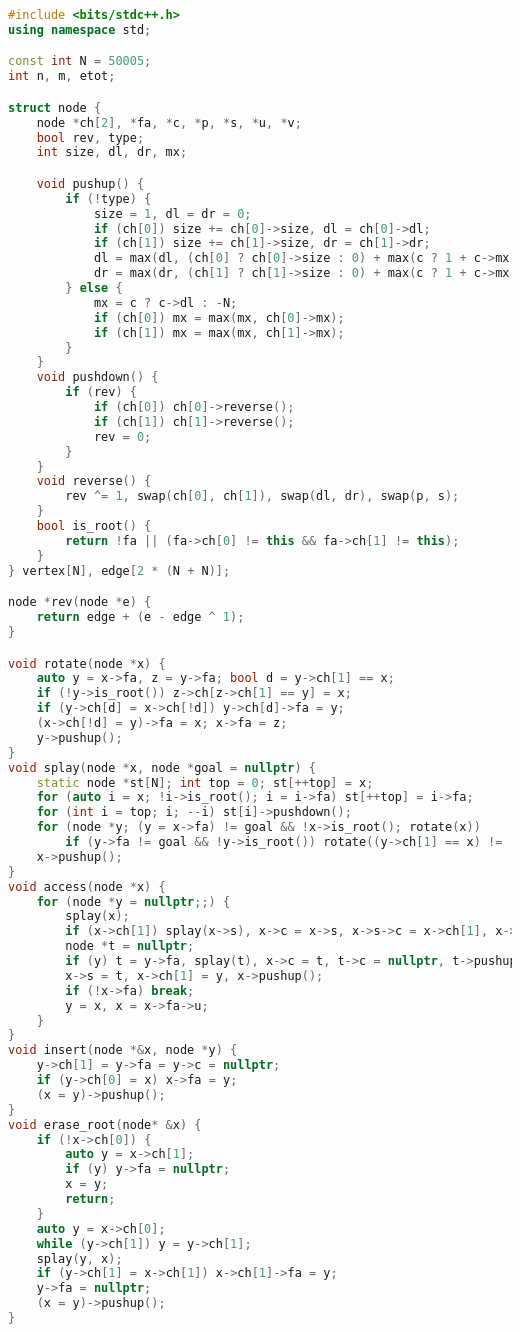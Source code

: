 \begin{lstlisting}[language=C++]
#include <bits/stdc++.h>
using namespace std;

const int N = 50005;
int n, m, etot;

struct node {
	node *ch[2], *fa, *c, *p, *s, *u, *v;
	bool rev, type;
	int size, dl, dr, mx;

	void pushup() {
		if (!type) {
			size = 1, dl = dr = 0;
			if (ch[0]) size += ch[0]->size, dl = ch[0]->dl;
			if (ch[1]) size += ch[1]->size, dr = ch[1]->dr;
			dl = max(dl, (ch[0] ? ch[0]->size : 0) + max(c ? 1 + c->mx : 0, (ch[1] ? 1 + ch[1]->dl : 0)));
			dr = max(dr, (ch[1] ? ch[1]->size : 0) + max(c ? 1 + c->mx : 0, (ch[0] ? 1 + ch[0]->dr : 0)));
		} else {
			mx = c ? c->dl : -N;
			if (ch[0]) mx = max(mx, ch[0]->mx);
			if (ch[1]) mx = max(mx, ch[1]->mx);
		}
	}
	void pushdown() {
		if (rev) {
			if (ch[0]) ch[0]->reverse();
			if (ch[1]) ch[1]->reverse();
			rev = 0;
		}
	}
	void reverse() {
		rev ^= 1, swap(ch[0], ch[1]), swap(dl, dr), swap(p, s);
	}
	bool is_root() {
		return !fa || (fa->ch[0] != this && fa->ch[1] != this);
	}
} vertex[N], edge[2 * (N + N)];

node *rev(node *e) {
	return edge + (e - edge ^ 1);
}

void rotate(node *x) {
	auto y = x->fa, z = y->fa; bool d = y->ch[1] == x;
	if (!y->is_root()) z->ch[z->ch[1] == y] = x;
	if (y->ch[d] = x->ch[!d]) y->ch[d]->fa = y;
	(x->ch[!d] = y)->fa = x; x->fa = z;
	y->pushup();
}
void splay(node *x, node *goal = nullptr) {
	static node *st[N]; int top = 0; st[++top] = x;
	for (auto i = x; !i->is_root(); i = i->fa) st[++top] = i->fa;
	for (int i = top; i; --i) st[i]->pushdown();
	for (node *y; (y = x->fa) != goal && !x->is_root(); rotate(x))
		if (y->fa != goal && !y->is_root()) rotate((y->ch[1] == x) != (y->fa->ch[1] == y) ? x : y);
	x->pushup();
}
void access(node *x) {
	for (node *y = nullptr;;) {
		splay(x);
		if (x->ch[1]) splay(x->s), x->c = x->s, x->s->c = x->ch[1], x->ch[1]->fa = x->s, x->s->pushup();
		node *t = nullptr;
		if (y) t = y->fa, splay(t), x->c = t, t->c = nullptr, t->pushup(), y->fa = x;
		x->s = t, x->ch[1] = y, x->pushup();
		if (!x->fa) break;
		y = x, x = x->fa->u;
	}
}
void insert(node *&x, node *y) {
	y->ch[1] = y->fa = y->c = nullptr;
	if (y->ch[0] = x) x->fa = y;
	(x = y)->pushup();
}
void erase_root(node* &x) {
	if (!x->ch[0]) {
		auto y = x->ch[1];
		if (y) y->fa = nullptr;
		x = y;
		return;
	}
	auto y = x->ch[0];
	while (y->ch[1]) y = y->ch[1];
	splay(y, x);
	if (y->ch[1] = x->ch[1]) x->ch[1]->fa = y;
	y->fa = nullptr;
	(x = y)->pushup();
}


\end{lstlisting}

